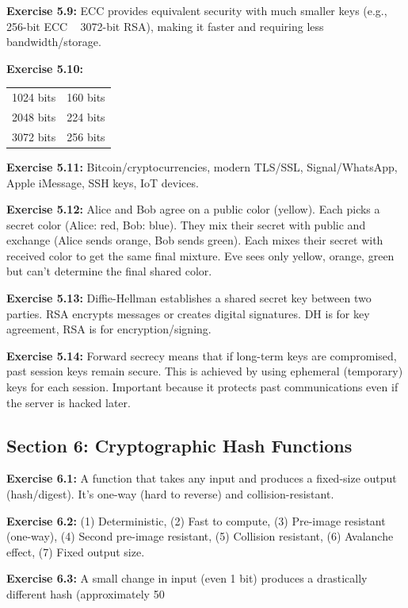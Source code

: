 \documentclass[11pt,a4paper]{report}
\begin{document}
\textbf{Exercise 5.9:}
ECC provides equivalent security with much smaller keys (e.g., 256-bit ECC ~ 3072-bit RSA), making it faster and requiring less bandwidth/storage.

\textbf{Exercise 5.10:}
\begin{center}
\begin{tabular}{|c|c|}
\hline
1024 bits & 160 bits \\
2048 bits & 224 bits \\
3072 bits & 256 bits \\
\hline
\end{tabular}
\end{center}

\textbf{Exercise 5.11:}
Bitcoin/cryptocurrencies, modern TLS/SSL, Signal/WhatsApp, Apple iMessage, SSH keys, IoT devices.

\textbf{Exercise 5.12:}
Alice and Bob agree on a public color (yellow). Each picks a secret color (Alice: red, Bob: blue). They mix their secret with public and exchange (Alice sends orange, Bob sends green). Each mixes their secret with received color to get the same final mixture. Eve sees only yellow, orange, green but can't determine the final shared color.

\textbf{Exercise 5.13:}
Diffie-Hellman establishes a shared secret key between two parties. RSA encrypts messages or creates digital signatures. DH is for key agreement, RSA is for encryption/signing.

\textbf{Exercise 5.14:}
Forward secrecy means that if long-term keys are compromised, past session keys remain secure. This is achieved by using ephemeral (temporary) keys for each session. Important because it protects past communications even if the server is hacked later.

\subsection*{Section 6: Cryptographic Hash Functions}

\textbf{Exercise 6.1:}
A function that takes any input and produces a fixed-size output (hash/digest). It's one-way (hard to reverse) and collision-resistant.

\textbf{Exercise 6.2:}
(1) Deterministic, (2) Fast to compute, (3) Pre-image resistant (one-way), (4) Second pre-image resistant, (5) Collision resistant, (6) Avalanche effect, (7) Fixed output size.

\textbf{Exercise 6.3:}
A small change in input (even 1 bit) produces a drastically different hash (approximately 50%
\end{document}
